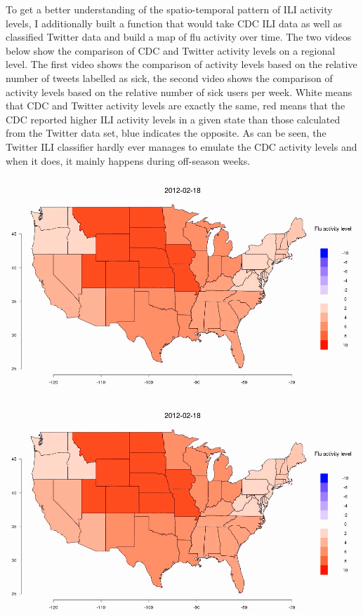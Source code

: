 \documentclass[11pt, a4paper]{report}\usepackage[]{graphicx}\usepackage[]{color}
\begin{document}
To get a better understanding of the spatio-temporal pattern of ILI activity levels, I additionally built a function that would take CDC ILI data as well as classified Twitter data and build a map of flu activity over time. The two videos below show the comparison of CDC and Twitter activity levels on a regional level. The first video shows the comparison of activity levels based on the relative number of tweets labelled as sick, the second video shows the comparison of activity levels based on the relative number of sick users per week. White means that CDC and Twitter activity levels are exactly the same, red means that the CDC reported higher ILI activity levels in a given state than those calculated from the Twitter data set, blue indicates the opposite. As can be seen, the Twitter ILI classifier hardly ever manages to emulate the CDC activity levels and when it does, it mainly happens during off-season weeks.\newline

\centering \href{run:vids/regional_Twitter_cdc_diff_full_rel_sick.avi}{\includegraphics[scale=0.5]{vids/Screenshot_Movie.png}} 

\bigskip

\centering \href{run:vids/regional_Twitter_cdc_diff_full_rel_sick_user.avi}{\includegraphics[scale=0.5]{vids/Screenshot_Movie.png}} 
\end{document}
